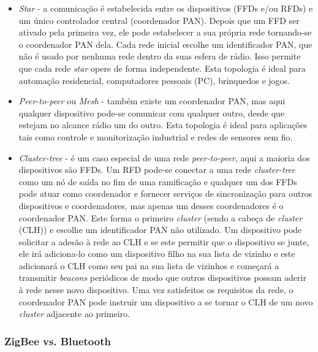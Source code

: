 \documentclass[conference]{IEEEtran}
\begin{document}
\begin{itemize}

 \item \textit{Star} - a comunicação é estabelecida entre os dispositivos (FFDs e/ou RFDs) e um único controlador central (coordenador PAN). Depois que um FFD ser ativado pela primeira vez, ele pode estabelecer a sua própria rede tornando-se o coordenador PAN dela. Cada rede inicial escolhe um identificador PAN, que não é usado por nenhuma rede dentro da suas esfera de rádio. Isso permite que cada rede \textit{star} opere de forma independente. Esta topologia é ideal para automação residencial, computadores pessoais (PC), brinquedos e jogos.
 
 \item \textit{Peer-to-peer} ou \textit{Mesh} - também existe um coordenador PAN, mas aqui qualquer dispositivo pode-se comunicar com qualquer outro, desde que estejam no alcance rádio um do outro. Esta topologia é ideal para aplicações tais como controle e monitorização industrial e redes de sensores sem fio. 
 
 \item \textit{Cluster-tree} - é um caso especial de uma rede \textit{peer-to-peer}, aqui a maioria dos dispositivos são FFDs. Um RFD pode-se conectar a uma rede \textit{cluster-tree} como um nó de saída no fim de uma ramificação e qualquer um dos FFDs pode atuar como coordenador e fornecer serviços de sincronização para outros dispositivos e coordenadores, mas apenas um desses coordenadores é o coordenador PAN. Este forma o primeiro \textit{cluster} (sendo a cabeça de \textit{cluster} (CLH)) e escolhe um identificador PAN não utilizado. Um dispositivo pode solicitar a adesão à rede ao CLH e se este permitir que o dispositivo se junte, ele irá adiciona-lo como um dispositivo filho na sua lista de vizinho e este adicionará o CLH como seu pai na sua lista de vizinhos e começará a transmitir \textit{beacons} periódicos de modo que outros dispositivos possam aderir à rede nesse novo dispositivo. Uma vez satisfeitos os requisitos da rede, o coordenador PAN pode instruir um dispositivo a se tornar o CLH de um novo \textit{cluster} adjacente ao primeiro. 

\end{itemize}


\subsubsection{ZigBee vs. Bluetooth}
\end{document}
